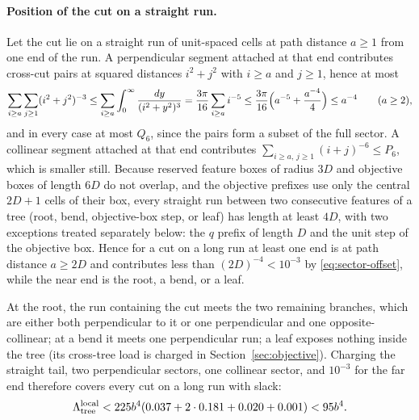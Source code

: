 \documentclass[12pt,a4paper]{article}
\begin{document}
\paragraph{Position of the cut on a straight run.}
Let the cut lie on a straight run of unit-spaced cells at path distance $a\ge1$ from one end of the run.  A perpendicular segment attached at that end contributes cross-cut pairs at squared distances $i^2+j^2$ with $i\ge a$ and $j\ge1$, hence at most
\begin{equation}\label{eq:sector-offset}
 \sum_{i\ge a}\sum_{j\ge1}(i^2+j^2)^{-3}
 \le\sum_{i\ge a}\int_0^\infty\frac{dy}{(i^2+y^2)^3}
 =\frac{3\pi}{16}\sum_{i\ge a}i^{-5}
 \le\frac{3\pi}{16}\Bigl(a^{-5}+\frac{a^{-4}}4\Bigr)
 \le a^{-4}\qquad(a\ge2),
\end{equation}
and in every case at most $Q_6$, since the pairs form a subset of the full sector.  A collinear segment attached at that end contributes $\sum_{i\ge a,\,j\ge1}(i+j)^{-6}\le P_6$, which is smaller still.  Because reserved feature boxes of radius $3D$ and objective boxes of length $6D$ do not overlap, and the objective prefixes use only the central $2D+1$ cells of their box, every straight run between two consecutive features of a tree (root, bend, objective-box step, or leaf) has length at least $4D$, with two exceptions treated separately below: the $q$ prefix of length $D$ and the unit step of the objective box.  Hence for a cut on a long run at least one end is at path distance $a\ge2D$ and contributes less than $(2D)^{-4}<10^{-3}$ by \eqref{eq:sector-offset}, while the near end is the root, a bend, or a leaf.

At the root, the run containing the cut meets the two remaining branches, which are either both perpendicular to it or one perpendicular and one opposite-collinear; at a bend it meets one perpendicular run; a leaf exposes nothing inside the tree (its cross-tree load is charged in Section~\ref{sec:objective}).  Charging the straight tail, two perpendicular sectors, one collinear sector, and $10^{-3}$ for the far end therefore covers every cut on a long run with slack:
\begin{equation}\label{eq:localtree}
 \Lambda_{\rm tree}^{\rm local}
 <225b^4(0.037+2\cdot0.181+0.020+0.001)
 <95b^4.
\end{equation}
\end{document}
